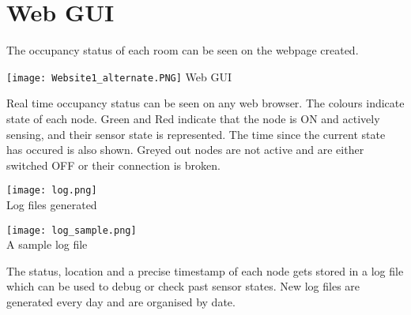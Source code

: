 \section{Web GUI}
The occupancy status of each room can be seen on the webpage created.

\begin{center}
	\texttt{[image: Website1\_alternate.PNG]}
     Web GUI
\end{center}

Real time occupancy status can be seen on any web browser. The colours indicate state of each node. Green and Red indicate that the node is ON and actively sensing, and their sensor state is represented. The time since the current state has occured is also shown. Greyed out nodes are not active and are either switched OFF or their connection is broken. 

\pagebreak

\begin{center}
	\texttt{[image: log.png]} \\
	Log files generated
	
	\vspace{20pt}
	
	\texttt{[image: log\_sample.png]} \\
	A sample log file
\end{center}


The status, location and a precise timestamp of each node gets stored in a log file which can be used to debug or check past sensor states. New log files are generated every day and are organised by date. 





